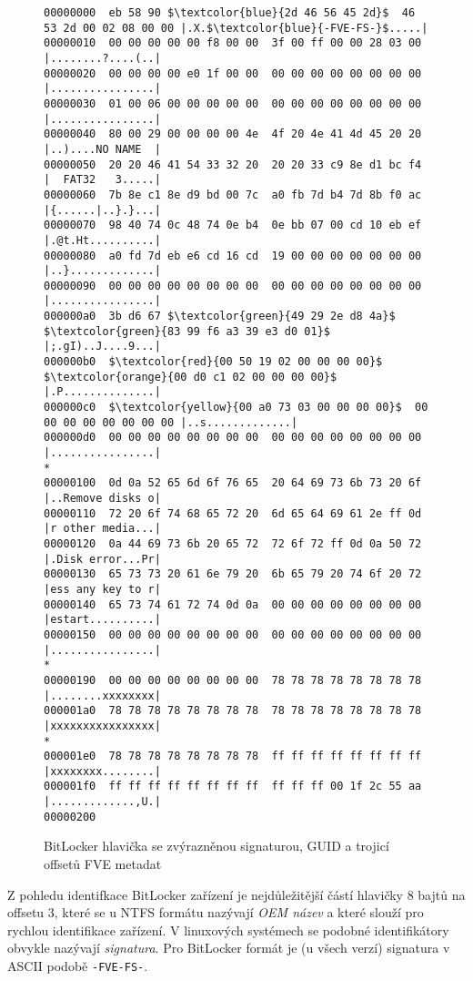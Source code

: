 \begin{figure}[h]
		\centering
		\captionsetup{width=0.65\linewidth}
\begin{lstlisting}[frame=none, escapechar=$, basicstyle=\ttfamily\small, columns=fullflexible, keepspaces=true]
00000000  eb 58 90 $\textcolor{blue}{2d 46 56 45 2d}$  46 53 2d 00 02 08 00 00 |.X.$\textcolor{blue}{-FVE-FS-}$.....|
00000010  00 00 00 00 00 f8 00 00  3f 00 ff 00 00 28 03 00 |........?....(..|
00000020  00 00 00 00 e0 1f 00 00  00 00 00 00 00 00 00 00 |................|
00000030  01 00 06 00 00 00 00 00  00 00 00 00 00 00 00 00 |................|
00000040  80 00 29 00 00 00 00 4e  4f 20 4e 41 4d 45 20 20 |..)....NO NAME  |
00000050  20 20 46 41 54 33 32 20  20 20 33 c9 8e d1 bc f4 |  FAT32   3.....|
00000060  7b 8e c1 8e d9 bd 00 7c  a0 fb 7d b4 7d 8b f0 ac |{......|..}.}...|
00000070  98 40 74 0c 48 74 0e b4  0e bb 07 00 cd 10 eb ef |.@t.Ht..........|
00000080  a0 fd 7d eb e6 cd 16 cd  19 00 00 00 00 00 00 00 |..}.............|
00000090  00 00 00 00 00 00 00 00  00 00 00 00 00 00 00 00 |................|
000000a0  3b d6 67 $\textcolor{green}{49 29 2e d8 4a}$  $\textcolor{green}{83 99 f6 a3 39 e3 d0 01}$ |;.gI)..J....9...|
000000b0  $\textcolor{red}{00 50 19 02 00 00 00 00}$  $\textcolor{orange}{00 d0 c1 02 00 00 00 00}$ |.P..............|
000000c0  $\textcolor{yellow}{00 a0 73 03 00 00 00 00}$  00 00 00 00 00 00 00 00 |..s.............|
000000d0  00 00 00 00 00 00 00 00  00 00 00 00 00 00 00 00 |................|
*
00000100  0d 0a 52 65 6d 6f 76 65  20 64 69 73 6b 73 20 6f |..Remove disks o|
00000110  72 20 6f 74 68 65 72 20  6d 65 64 69 61 2e ff 0d |r other media...|
00000120  0a 44 69 73 6b 20 65 72  72 6f 72 ff 0d 0a 50 72 |.Disk error...Pr|
00000130  65 73 73 20 61 6e 79 20  6b 65 79 20 74 6f 20 72 |ess any key to r|
00000140  65 73 74 61 72 74 0d 0a  00 00 00 00 00 00 00 00 |estart..........|
00000150  00 00 00 00 00 00 00 00  00 00 00 00 00 00 00 00 |................|
*
00000190  00 00 00 00 00 00 00 00  78 78 78 78 78 78 78 78 |........xxxxxxxx|
000001a0  78 78 78 78 78 78 78 78  78 78 78 78 78 78 78 78 |xxxxxxxxxxxxxxxx|
*
000001e0  78 78 78 78 78 78 78 78  ff ff ff ff ff ff ff ff |xxxxxxxx........|
000001f0  ff ff ff ff ff ff ff ff  ff ff ff 00 1f 2c 55 aa |.............,U.|
00000200
\end{lstlisting}
		\caption{BitLocker hlavička se zvýrazněnou signaturou, GUID a trojicí offsetů FVE metadat}
		\label{fig:bitlocker-header}
\end{figure}

Z pohledu identifkace BitLocker zařízení je nejdůležitější částí hlavičky 8 bajtů na offsetu 3, které se u NTFS formátu nazývají \emph{OEM název} a které slouží pro rychlou identifikace zařízení. V linuxových systémech se podobné identifikátory obvykle nazývají \emph{signatura}.  Pro BitLocker formát je (u všech verzí) signatura v ASCII podobě \texttt{-FVE-FS-}.

